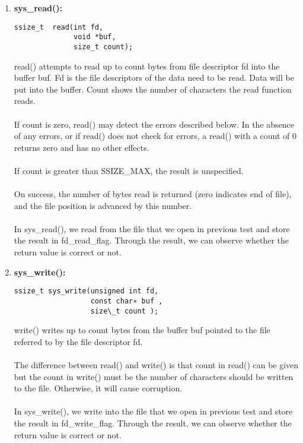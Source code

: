 \documentclass[twoside]{article}
\begin{document}
\begin{multicols}{2}
\begin{enumerate}
\item
{\bf sys\_read():}
{\footnotesize
\begin{lstlisting}
ssize_t  read(int fd, 
              void *buf, 
              size_t count);

\end{lstlisting}
\par}

\noindent
read() attempts to read up to count bytes from file descriptor fd into the buffer buf. Fd is the file descriptors of the data need to be read. Data will be put into the buffer. Count shows the number of characters the read function reads.  			\\\\
\noindent
If count is zero, read() may detect the errors described below. In the absence of any errors, or if read() does not check for errors, a read() with a count of 0 returns zero and has no other effects.
\\\\
\noindent
If count is greater than SSIZE\_MAX, the result is unspecified.	\\\\
\noindent
On success, the number of bytes read is returned (zero indicates end of file), and the file position is advanced by this number. 
\\\\
\noindent
In sys\_read(), we read from the file that we open in previous test and store the result in fd\_read\_flag. Through the result, we can observe whether the return value is correct or not.

\item
{\bf sys\_write():}
{\footnotesize
\begin{lstlisting}
ssize_t sys_write(unsigned int fd,
                  const char∗ buf , 
                  size\_t count ); 
\end{lstlisting}
\par}
\noindent
write() writes up to count bytes from the buffer buf pointed to the file referred to by the file descriptor fd. 
\\\\
\noindent
The difference between read() and write() is that count in read() can be given but the count in write() must be the number of characters should be written to the file. Otherwise, it will cause corruption. 
\\\\
\noindent
In sys\_write(), we write into the file that we open in previous test and store the result in fd\_write\_flag.  Through the result, we can observe whether the return value is correct or not.


\end{enumerate}
\end{multicols}
\end{document}
